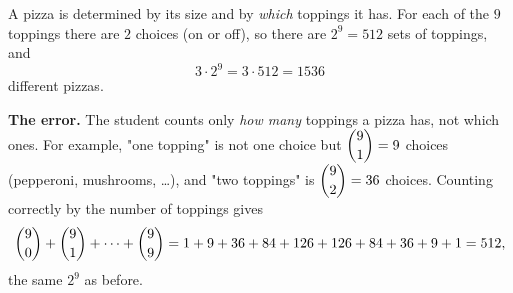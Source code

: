 A pizza is determined by its size and by \emph{which} toppings it has. For each of the $9$ toppings there are $2$ choices (on or off), so there are $2^9=512$ sets of toppings, and
\[
3\cdot2^9=3\cdot512=\boxed{1536}
\]
different pizzas.

\textbf{The error.} The student counts only \emph{how many} toppings a pizza has, not which ones. For example, "one topping" is not one choice but $\dbinom91=9$ choices (pepperoni, mushrooms, \dots), and "two toppings" is $\dbinom92=36$ choices. Counting correctly by the number of toppings gives
\[
\dbinom90+\dbinom91+\cdots+\dbinom99=1+9+36+84+126+126+84+36+9+1=512,
\]
the same $2^9$ as before.
